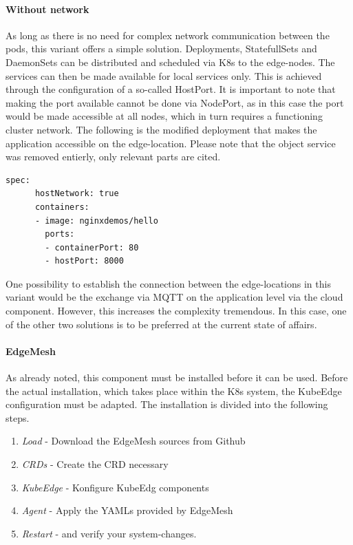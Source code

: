 \documentclass[MSC,Master,english]{twbook}%
\begin{document}
\paragraph{Without network} As long as there is no need for complex network communication between the pods, this variant offers a simple solution. Deployments, StatefullSets and DaemonSets can be distributed and scheduled via \ac{K8s} to the edge-nodes. The services can then be made available for local services only. This is achieved through the configuration of a so-called HostPort. It is important to note that making the port available cannot be done via NodePort, as in this case the port would be made accessible at all nodes, which in turn requires a functioning cluster network. The following is the modified deployment that makes the application accessible on the edge-location. Please note that the object service was removed entierly, only relevant parts are cited.
\begin{lstlisting}[caption={Web-application HostPort },captionpos=b]
    spec:
      hostNetwork: true
      containers:
      - image: nginxdemos/hello
        ports:
        - containerPort: 80
        - hostPort: 8000
\end{lstlisting}

One possibility to establish the connection between the edge-locations in this variant would be the exchange via MQTT on the application level via the cloud component. However, this increases the complexity tremendous. In this case, one of the other two solutions is to be preferred at the current state of affairs.

\paragraph{EdgeMesh} As already noted, this component must be installed before it can be used. Before the actual installation, which takes place within the \ac{K8s} system, the KubeEdge configuration must be adapted. The installation is divided into the following steps.

\begin{enumerate}
    \item \textit{Load} - Download the EdgeMesh sources from Github
    \item \textit{CRDs} - Create the \ac{CRD} necessary
    \item \textit{KubeEdge} - Konfigure KubeEdg components
    \item \textit{Agent} - Apply the YAMLs provided by EdgeMesh
    \item \textit{Restart} - and verify your system-changes.
\end{enumerate}
\end{document}

